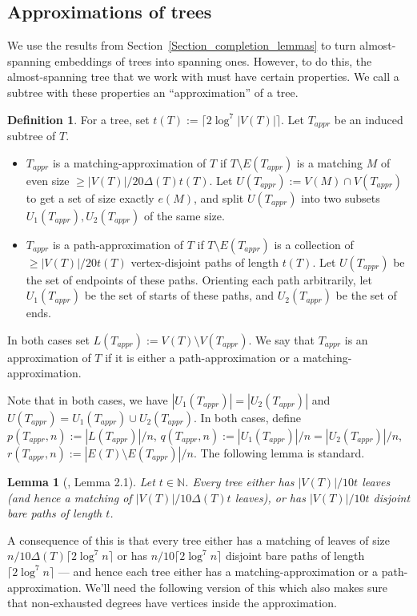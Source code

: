 \documentclass[a4paper,11pt,hidelinks]{amsart}
\newtheorem{lemma}[theorem]{Lemma}
\theoremstyle{definition}
\newtheorem{definition}[theorem]{Definition}
\begin{document}
\subsection{Approximations of trees}
We use the results from Section~\ref{Section_completion_lemmas} to turn almost-spanning embeddings of trees into spanning ones. However, to do this, the almost-spanning tree that we work with must have certain properties. We call a subtree with these properties an ``approximation'' of a tree. 
\begin{definition}
For a tree, set $t(T):=\lceil 2\log^7 |V(T)|\rceil$. Let $T_{appr}$ be an induced subtree of $T$.
\begin{itemize}
\item $T_{appr}$ is a matching-approximation of $T$ if $T\setminus E(T_{appr})$ is a matching $M$ of even size  $\geq |V(T)|/20\Delta(T) t(T)$. Let $U(T_{appr}):=V(M)\cap V(T_{appr})$ to get a set of size exactly $e(M)$, and split $U(T_{appr})$ into two subsets $U_1(T_{appr}), U_2(T_{appr})$ of the same size. 
\item $T_{appr}$ is a path-approximation of $T$ if $T\setminus E(T_{appr})$ is a collection of $\geq |V(T)|/20t(T)$ vertex-disjoint paths of length $t(T)$. Let $U(T_{appr})$ be the set of endpoints of these paths. Orienting each path arbitrarily, let $U_1(T_{appr})$ be the set of starts of these paths, and $U_2(T_{appr})$ be the set of ends.  
\end{itemize}
In both cases set $L(T_{appr}):=V(T)\setminus V(T_{appr})$.
We say that $T_{appr}$ is an approximation of $T$ if it is either a path-approximation or a matching-approximation.
\end{definition}
Note that in both cases, we have $|U_1(T_{appr})|=|U_2(T_{appr})|$ and $U(T_{appr})=U_1(T_{appr})\cup U_2(T_{appr})$. In both cases, define $p(T_{appr},n):=|L(T_{appr})|/n$, $q(T_{appr},n):=|U_1(T_{appr})|/n=|U_2(T_{appr})|/n$,  $r(T_{appr},n):=|E(T)\setminus E(T_{appr})|/n$.
The following lemma is standard.
\begin{lemma}[\cite{krivelevich2010embedding}, Lemma 2.1]\label{Lemma_tree_leaves_bare_paths}
Let $t\in \mathbb N$. Every tree either has  $|V(T)|/10t$ leaves (and hence a matching of $|V(T)|/10\Delta(T)t$ leaves), or has $|V(T)|/10t$ disjoint bare paths of length $t$.
\end{lemma}
A consequence of this is that every tree either has a matching of leaves of size $n/ 10 \Delta(T)\lceil 2\log^7n\rceil$ or has $n/10\lceil2\log^7n\rceil$ disjoint bare paths of length $\lceil2\log^7n\rceil$ --- and hence each tree either has a matching-approximation or a path-approximation. We'll need the following version of this which also makes sure that non-exhausted degrees have vertices inside the approximation.
\end{document}
